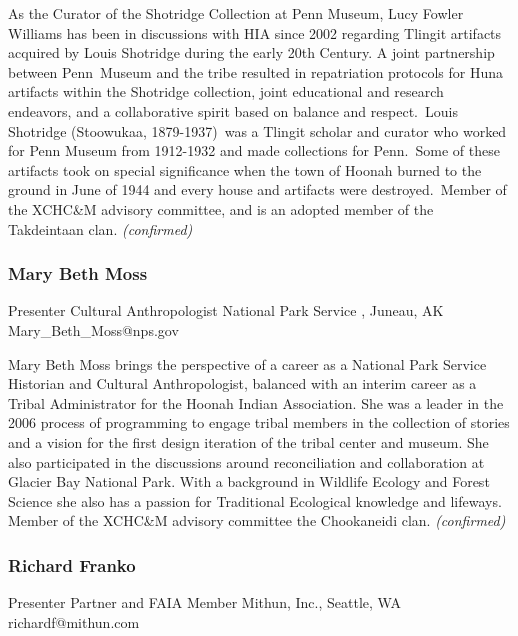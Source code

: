 \documentclass{report}
\begin{document}
                As the Curator of the Shotridge Collection at Penn Museum, Lucy Fowler Williams has been in discussions with HIA since 2002 regarding Tlingit artifacts acquired by Louis Shotridge during the early 20th Century. A joint partnership between Penn Museum and the tribe resulted in repatriation protocols for Huna artifacts within the Shotridge collection, joint educational and research endeavors, and a collaborative spirit based on balance and respect. Louis Shotridge (Stoowukaa, 1879-1937) was a Tlingit scholar and curator who worked for Penn Museum from 1912-1932 and made collections for Penn. Some of these artifacts took on special significance when the town of Hoonah burned to the ground in June of 1944 and every house and artifacts were destroyed. Member of the XCHC\&M advisory committee, and is an adopted member of the Takdeintaan clan.
                \emph{ (confirmed) }
              

              
                \subsubsection*{ Mary Beth Moss }
                Presenter\newline
                Cultural Anthropologist\newline
                National Park Service , Juneau, AK
                \newline
                Mary_Beth_Moss@nps.gov\newline
                
                

                Mary Beth Moss brings the perspective of a career as a National Park Service Historian and Cultural Anthropologist, balanced with an interim career as a Tribal Administrator for the Hoonah Indian Association. She was a leader in the 2006 process of programming to engage tribal members in the collection of stories and a vision for the first design iteration of the tribal center and museum. She also participated in the discussions around reconciliation and collaboration at Glacier Bay National Park.    With a background in Wildlife Ecology and Forest Science she also has a passion for Traditional Ecological knowledge and lifeways.  Member of the XCHC\&M advisory committee the Chookaneidi clan.
                \emph{ (confirmed) }
              

              
                \subsubsection*{ Richard Franko }
                Presenter\newline
                Partner and FAIA Member\newline
                Mithun, Inc., Seattle, WA
                \newline
                richardf@mithun.com\newline
                
\end{document}
